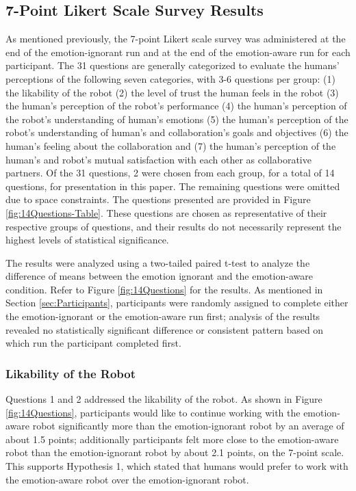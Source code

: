 \documentclass{sig-alternate-05-2015}
\begin{document}
\subsection{7-Point Likert Scale Survey Results}
As mentioned previously, the 7-point Likert scale survey was administered at
the end of the emotion-ignorant run and at the end of the emotion-aware run for
each participant. The 31 questions are generally categorized to evaluate the
humans' perceptions of the following seven categories, with 3-6 questions per
group: (1) the likability of the robot (2) the level of trust the human feels
in the robot (3) the human's perception of the robot's performance (4) the
human's perception of the robot's understanding of human's emotions (5) the
human's perception of the robot's understanding of human's and collaboration's
goals and objectives (6) the human's feeling about the collaboration and (7)
the human's perception of the human's and robot's mutual satisfaction with each
other as collaborative partners. Of the 31 questions, 2 were chosen from each
group, for a total of 14 questions, for presentation in this paper. The
remaining questions were omitted due to space constraints. The questions
presented are provided in Figure \ref{fig:14Questions-Table}. These questions
are chosen as representative of their respective groups of questions, and their
results do not necessarily represent the highest levels of statistical
significance.

The results were analyzed using a two-tailed paired t-test to analyze the
difference of means between the emotion ignorant and the emotion-aware
condition. Refer to Figure \ref{fig:14Questions} for the results. As mentioned
in Section \ref{sec:Participants}, participants were randomly assigned to complete
either the emotion-ignorant or the emotion-aware run first; analysis of the
results revealed no statistically significant difference or consistent pattern
based on which run the participant completed first.

\vspace*{-3mm}
\subsubsection{Likability of the Robot}
\label{sec:Likability}
Questions 1 and 2 addressed the likability of the robot. As shown in Figure
\ref{fig:14Questions}, participants would like to continue working with the emotion-aware
robot significantly more than the emotion-ignorant robot by an average of about 1.5
points; additionally participants felt more close to the emotion-aware robot
than the emotion-ignorant robot by about 2.1 points, on the 7-point scale. This
supports Hypothesis 1, which stated that humans would prefer to work with the
emotion-aware robot over the emotion-ignorant robot.
\end{document}
